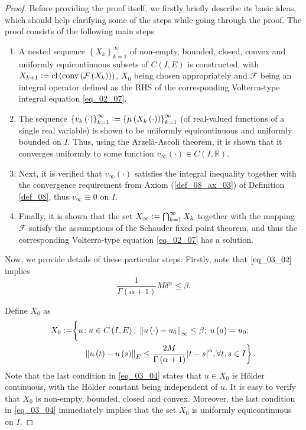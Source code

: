 \documentclass[reqno]{amsart}
\numberwithin{equation}{section}
\theoremstyle{definition}
\theoremstyle{remark}
\newcommand{\axiomRef}[1]{\textrm{Axiom (\ref{#1})}}
\newcommand{\br}[1]{\left(#1\right)}
\newcommand{\C}[2]{C\br{#1,#2}}
\newcommand{\cbr}[1]{\left\{#1\right\}}
\newcommand{\cl}[1]{\clOperator\br{#1}}
\newcommand{\conv}[1]{\convOperator\br{#1}}
\newcommand{\definitionRef}[1]{\textrm{Definition \ref{#1}}}
\newcommand{\defeq}{\vcentcolon=}
\newcommand{\fF}{\mathcal{F}}
\newcommand{\R}{\mathbb{R}}
\newcommand{\st}{\!:}
\DeclareMathOperator{\clOperator}{cl}
\DeclareMathOperator{\convOperator}{conv}
\begin{document}
	\begin{proof}
	Before providing the proof itself, we firstly briefly describe its basic ideas, which should help clarifying some of the steps while going through the proof. The proof consists of the following main steps
	\begin{enumerate}[1.]
		\item A nested sequence $\cbr{X_k}_{k=1}^\infty$ of non-empty, bounded, closed, convex and uniformly equicontinuous subsets of $C\br{I,E}$ is constructed, with $X_{k+1}\defeq\cl{\conv{\fF\br{X_k}}}$, $X_0$ being chosen appropriately and $\fF$ being an integral operator defined as the RHS of the corresponding Volterra-type integral equation \eqref{eq_02_07}.
		\item The sequence $\cbr{v_k\br{\cdot}}_{k=1}^{\infty}\defeq\cbr{\mu\br{X_k\br{\cdot}}}_{k=1}^{\infty}$ (of real-valued functions of a single real variable) is shown to be uniformly equicontinuous and uniformly bounded on $I$. Thus, using the Arzelà-Ascoli theorem, it is shown that it converges uniformly to some function $v_{\infty}\br{\cdot}\in{C}\br{I,\R}$.
		\item Next, it is verified that $v_{\infty}\br{\cdot}$ satisfies the integral inequality together with the convergence requirement from \axiomRef{def_08_ax_03} of \definitionRef{def_08}, thus $v_{\infty}\equiv0$ on $I$.
		\item Finally, it is shown that the set $X_{\infty}\defeq\bigcap_{k=1}^{\infty}X_k$ together with the mapping $\fF$ satisfy the assumptions of the Schauder fixed point theorem, and thus the corresponding Volterra-type equation \eqref{eq_02_07} has a solution.
	\end{enumerate}
	
	Now, we provide details of these particular steps. Firstly, note that $\eqref{eq_03_02}$ implies
	\begin{equation}\label{eq_03_03}
		\frac{1}{\Gamma\br{\alpha+1}}M\delta^{\alpha}\leq\beta.
	\end{equation}
	
	Define $X_0$ as
	\begin{equation}\label{eq_03_04}
		\begin{aligned}
			X_0\defeq&\biggl\{u\st{u}\in\C{I}{E};\;\norm{u\br{\cdot}-u_0}_{\infty}\leq\beta;\;u\br{a}=u_0;\\
			&\phantom{\biggl\{u}\left.\norm{u\br{t}-u\br{s}}_E\leq\frac{2M}{\Gamma\br{\alpha+1}}\abs{t-s}^{\alpha},\forall{t,s}\in{I}\right\}.
		\end{aligned}
	\end{equation}
	Note that the last condition in \eqref{eq_03_04} states that $u\in{X}_0$ is Hölder continuous, with the Hölder constant being independent of $u$. It is easy to verify that $X_0$ is non-empty, bounded, closed and convex. Moreover, the last condition in \eqref{eq_03_04} immediately implies that the set $X_0$ is uniformly equicontinuous on $I$.
	

\end{proof}
\end{document}
